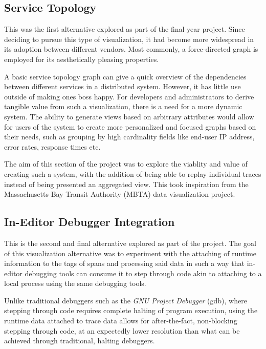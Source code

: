 \documentclass[pdftex,titlepage]{article}
\begin{document}
        \subsection{Service Topology}
        This was the first alternative explored as part of the final year project. Since deciding to pursue this type of visualization,
        it had become more widespread in its adoption between different vendors\cite{risingstacktopo}\cite{kialitopo}. Most commonly, 
        a force-directed graph is employed for its aesthetically pleasing properties.

        A basic service topology graph can give a quick overview of the dependencies between different services in a distributed
        system. However, it has little use outside of making ones boss happy. For developers and administrators to derive tangible
        value from such a visualization, there is a need for a more dynamic system. The ability to generate views based on arbitrary
        attributes would allow for users of the system to create more personalized and focused graphs based on their needs,
        such as grouping by high cardinality fields like end-user IP address, error rates, response times etc\cite{doingitwrongtopo}.

        The aim of this section of the project was to explore the viablity and value of creating such a system, with the addition
        of being able to replay individual traces instead of being presented an aggregated view. This took inspiration from the
        Massachusetts Bay Transit Authority (MBTA) data visualization project\cite{mbta}.

        \subsection{In-Editor Debugger Integration}
        This is the second and final alternative explored as part of the project. The goal of this visualization alternative was to
        experiment with the attaching of runtime information to the tags of spans and processing said data in such a way that in-editor
        debugging tools can consume it to step through code akin to attaching to a local process using the same debugging tools.

        Unlike traditional debuggers such as the \textit{GNU Project Debugger} (gdb), where stepping through code requires complete
        halting of program execution, using the runtime data attached to trace data allows for after-the-fact, non-blocking stepping
        through code, at an expectedly lower resolution than what can be achieved through traditional, halting debuggers.
\end{document}

